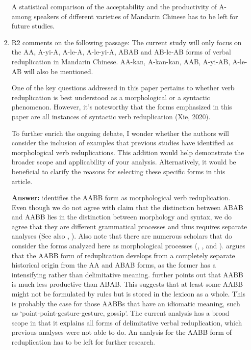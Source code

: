 \documentclass[fleqn,twoside]{article}
\begin{document}
\begin{enumerate}
A statistical comparison of the acceptability and the productivity of A- among speakers of different varieties of Mandarin Chinese has to be left for future studies.

\item
R2 comments on the following passage: The current study will only focus on the AA, A-yi-A, A-le-A, A-le-yi-A, ABAB and
AB-le-AB forms of verbal reduplication in Mandarin Chinese. AA-kan, A-kan-kan,
AAB, A-yi-AB, A-le-AB will also be mentioned.

One of the key questions addressed in this paper pertains to whether verb reduplication is best understood as a morphological or a syntactic phenomenon. However, it's noteworthy that the forms emphasized in this paper are all instances of syntactic verb reduplication (Xie, 2020).

To further enrich the ongoing debate, I wonder whether the authors will consider the inclusion of examples that previous studies have identified as morphological verb reduplications. This addition would help demonstrate the broader scope and applicability of your analysis. Alternatively, it would be beneficial to clarify the reasons for selecting these specific forms in this article.

\noindent
\textbf{Answer:}
\citet{Xie2020} identifies the AABB form as morphological verb reduplication.
Even though we do not agree with  claim that the distinction between ABAB and AABB lies in the distinction between morphology and syntax,
we do agree that they are different grammatical processes and thus requires separate analyses (See also \citealt[Sec. 4.3]{Deng2013}, \citealt{Wang2023}).
Also note that there are numerous scholars that do consider the forms analyzed here as morphological processes (\citealt[Ch. 4]{Chao1968}, \citealt[Ch. 3]{LiThompson1981}, \citealt[4--5]{Liao2014} and \citealt[Sec. 4]{Sui2018}).
\citet[14--15]{Zhang2000} argues that the AABB form of reduplication develops from a completely separate historical origin from the AA and ABAB forms,
as the former has a intensifying rather than delimitative meaning.
\citet[83--84]{Xie2020} further points out that AABB is much less productive than ABAB.
This suggests that at least some AABB might not be formulated by rules but is stored in the lexicon as a whole.
This is probably the case for those AABBs that have an idiomatic meaning, such as  `point-point-gesture-gesture, gossip'.
The current analysis has a broad scope in that it explains all forms of delimitative verbal reduplication, which previous analyses were not able to do.
An analysis for the AABB form of reduplication has to be left for further research.


\end{enumerate}
\end{document}
